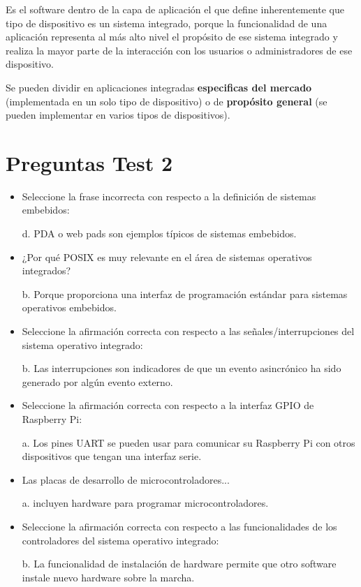 \documentclass[12pt]{report} %
\begin{document}
Es el software dentro de la capa de aplicación el que define inherentemente que tipo de dispositivo es un sistema integrado, porque la funcionalidad de una aplicación representa al más alto nivel el propósito de ese sistema integrado y realiza la mayor parte de la interacción con los usuarios o administradores de ese dispositivo.

Se pueden dividir en aplicaciones integradas \textbf{especificas del mercado} (implementada en un solo tipo de dispositivo) o de \textbf{propósito general} (se pueden implementar en varios tipos de dispositivos).

\section{Preguntas Test 2}
\begin{itemize}
	\item Seleccione la frase incorrecta con respecto a la definición de sistemas embebidos:
	
	d. PDA o web pads son ejemplos típicos de sistemas embebidos.
	
	\item ¿Por qué POSIX es muy relevante en el área de sistemas operativos integrados?
	
	b. Porque proporciona una interfaz de programación estándar para sistemas operativos embebidos. 
	
	\item Seleccione la afirmación correcta con respecto a las señales/interrupciones del sistema operativo integrado:
	
	b. Las interrupciones son indicadores de que un evento asincrónico ha sido generado por algún evento externo.
	
	\item Seleccione la afirmación correcta con respecto a la interfaz GPIO de Raspberry Pi:
	
	a. Los pines UART se pueden usar para comunicar su Raspberry Pi con otros dispositivos que tengan una interfaz serie.
	
	\item Las placas de desarrollo de microcontroladores...
	
	a. incluyen hardware para programar microcontroladores. 
	
	\item Seleccione la afirmación correcta con respecto a las funcionalidades de los controladores del sistema operativo integrado:
	
	b. La funcionalidad de instalación de hardware permite que otro software instale nuevo hardware sobre la marcha.
	

\end{itemize}
\end{document}
